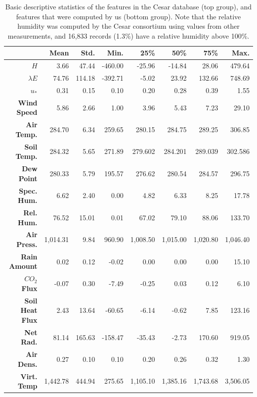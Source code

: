 \documentclass[12pt]{book}
\begin{document}
\begin{table}[]
\centering
\caption{Basic descriptive statistics of the features in the Cesar database (top group), and features that were computed by us (bottom group).  Note that the relative humidity was computed by the Cesar consortium using values from other measurements, and 16,833 records  (1.3\%) have a relative humidity above 100\%.}
\label{tbl:col_summary}
\begin{tabular}{r|rrrrrrr}
& \textbf{Mean} & \textbf{Std.} & \textbf{Min.} & \textbf{25\%} & \textbf{50\%} & \textbf{75\%} & \textbf{Max.} \\ \hline
\textbf{$H$} & 3.66 & 47.44 & -460.00 & -25.96 & -14.84 & 28.06 & 479.64 \\
\textbf{$\lambda E$} & 74.76 & 114.18 & -392.71 & -5.02& 23.92 & 132.66 & 748.69 \\
\textbf{$u_*$} & 0.31 & 0.15 & 0.10 & 0.20 & 0.28 & 0.39 & 1.55 \\
\textbf{Wind Speed} & 5.86 & 2.66 & 1.00 & 3.96 & 5.43 & 7.23 & 29.10 \\
\textbf{Air Temp.} & 284.70 & 6.34 & 259.65 & 280.15 & 284.75 & 289.25 & 306.85 \\
\textbf{Soil Temp.} & 284.32 & 5.65 & 271.89 & 279.602 & 284.201 & 289.039 & 302.586 \\
\textbf{Dew Point} & 280.33 & 5.79 & 195.57 & 276.62 & 280.54 & 284.57 & 296.75 \\
\textbf{Spec. Hum.} & 6.62 & 2.40 & 0.00 & 4.82 & 6.33 & 8.25 & 17.78 \\
\textbf{Rel. Hum.} & 76.52 & 15.01 & 0.01 & 67.02 & 79.10 & 88.06 & 133.70 \\
\textbf{Air Press.} & 1,014.31 & 9.84 & 960.90 & 1,008.50 & 1,015.00 & 1,020.80 & 1,046.40 \\
\textbf{Rain Amount} & 0.02 & 0.12 & -0.02 & 0.00 & 0.00 & 0.00 & 15.10 \\
\textbf{$CO_2$ Flux} & -0.07 & 0.30 & -7.49 & -0.25 & 0.03 & 0.12 & 6.10 \\
\textbf{Soil Heat Flux} & 2.43 & 13.64 & -60.65 & -6.14 & -0.62 & 7.85 & 123.16 \\
\textbf{Net Rad.} & 81.14 & 165.63 & -158.47 & -35.43 & -2.73 & 170.60 & 919.05 \\ \hline
\textbf{Air Dens.} & 0.27 & 0.10 & 0.10 & 0.20 & 0.26 & 0.32 & 1.30 \\
\textbf{Virt. Temp} & 1,442.78 & 444.94 & 275.65 & 1,105.10 & 1,385.16 & 1,743.68 & 3,506.05 \\
\end{tabular} 
\end{table}
\end{document}
